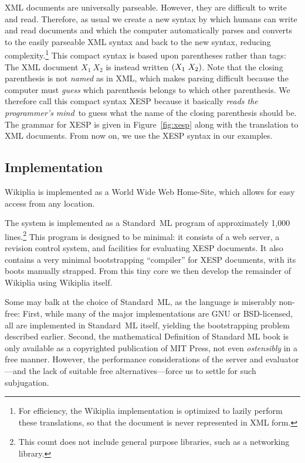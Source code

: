 \documentclass[twocolumn]{article}
\begin{document}
XML documents are universally parseable.\z{} However,
they are difficult to write and read. Therefore, as usual we create a new syntax by which humans can write and read
documents and which the computer automatically parses and converts to
the easily parseable XML syntax and back to the new syntax, reducing
complexity.\z\footnote{For efficiency, the Wikiplia implementation is
optimized to lazily perform these translations, so that the document
is never represented in XML form.} This compact syntax is based upon
parentheses rather than tags: The XML document $\tag{list}{X_1\ X_2}$
is instead written ${\tt(}X_1\ X_2{\tt)}$. Note that the closing
parenthesis is not {\em named} as in XML, which makes parsing
difficult because the computer must {\em guess} which parenthesis
belongs to which other parenthesis. We therefore call this compact
syntax XESP because it basically {\em reads the programmer's
mind}\, to guess what the name of the
closing parenthesis should be. The grammar for XESP is given in
Figure~\ref{fig:xesp} along with the translation to XML documents.
From now on, we use the XESP syntax in our examples.

\subsection{Implementation}

Wikiplia is implemented as a World Wide Web Home-Site, which allows
for easy access from any location.

The system is implemented as a Standard~ML program
of approximately 1,000 lines.\z\footnote{This count does not include
general purpose libraries, such as a networking library.} This program
is designed to be minimal: it consists of a web server, a revision
control system, and facilities for evaluating XESP documents. It also
contains a very minimal bootstrapping ``compiler'' for XESP documents,
with its boots manually strapped. From this tiny core we then develop
the remainder of Wikiplia using Wikiplia itself.

Some may balk at the choice of Standard~ML, as the language is
miserably non-free: First, while many of the major implementations are
GNU or BSD-licensed,\z{} all are implemented in
Standard~ML itself, yielding the bootstrapping problem described
earlier. Second, the mathematical Definition of Standard ML book is
only available as a copyrighted publication of MIT
Press,\z{} not even {\em ostensibly} in a free
manner. However, the performance considerations of the server and
evaluator---and the lack of suitable free alternatives---force us to
settle for such subjugation.
\end{document}
